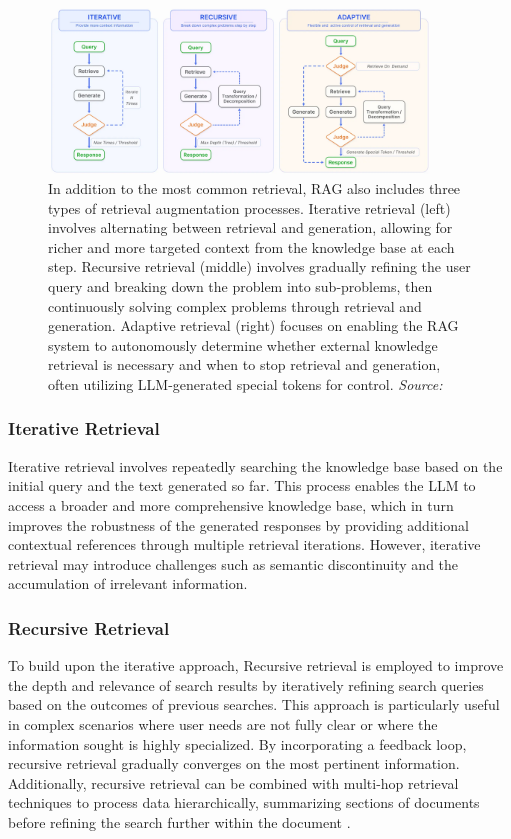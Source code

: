 \begin{figure}[h]
    \centering
    \includegraphics[width=0.9\textwidth]{images/llms/augmentation-process.png}
    \caption{In addition to the most common retrieval, RAG also includes three types of retrieval augmentation processes. Iterative retrieval (left) involves alternating between retrieval and generation, allowing for richer and more targeted context from the knowledge base at each step. Recursive retrieval (middle) involves gradually refining the user query and breaking down the problem into sub-problems, then continuously solving complex problems through retrieval and generation. Adaptive retrieval (right) focuses on enabling the RAG system to autonomously determine whether external knowledge retrieval is necessary and when to stop retrieval and generation, often utilizing LLM-generated special tokens for control. \textit{Source:} \cite{gao2023retrieval}}
    \label{fig:rag_augmentation}
\end{figure}

\subsubsection{Iterative Retrieval}

Iterative retrieval involves repeatedly searching the knowledge base based on the initial query and the text generated so far. This process enables the LLM to access a broader and more comprehensive knowledge base, which in turn improves the robustness of the generated responses by providing additional contextual references through multiple retrieval iterations. However, iterative retrieval may introduce challenges such as semantic discontinuity and the accumulation of irrelevant information.

\subsubsection{Recursive Retrieval}

To build upon the iterative approach, Recursive retrieval is employed to improve the depth and relevance of search results by iteratively refining search queries based on the outcomes of previous searches. This approach is particularly useful in complex scenarios where user needs are not fully clear or where the information sought is highly specialized. By incorporating a feedback loop, recursive retrieval gradually converges on the most pertinent information. Additionally, recursive retrieval can be combined with multi-hop retrieval techniques to process data hierarchically, summarizing sections of documents before refining the search further within the document \cite{gao2023retrieval}.

